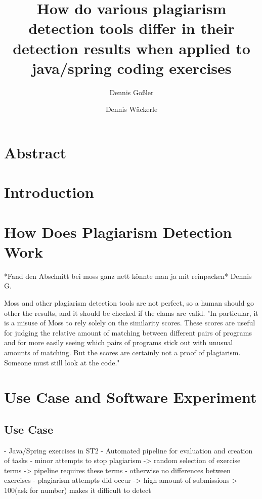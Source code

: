 \documentclass[a4paper, 11pt]{article}
\renewcommand{\\}{\vspace*{0.5\baselineskip} \newline}
\begin{document}
\title{How do various plagiarism detection tools differ in their detection results when applied to java/spring coding exercises}
\author{Dennis Goßler \and Dennis Wäckerle}
\maketitle

\section*{Abstract}
\newpage
\tableofcontents
\newpage

\section{Introduction}

\section{How Does Plagiarism Detection Work}


*Fand den Abschnitt bei moss ganz nett könnte man ja mit reinpacken* Dennis G.

Moss and other plagiarism detection tools are not perfect, so a human should go other the results, and it should be checked if the clams are valid.
"In particular, it is a misuse of Moss to rely solely on the similarity scores. These scores are useful for judging the relative amount of matching between different pairs of programs and for more easily seeing which pairs of programs stick out with unusual amounts of matching. But the scores are certainly not a proof of plagiarism. Someone must still look at the code."
\autocite{SMOSS}

\section{Use Case and Software Experiment}

\subsection{Use Case}

- Java/Spring exercises in ST2
- Automated pipeline for evaluation and creation of tasks
- minor attempts to stop plagiarism -> random selection of exercise terms -> pipeline requires these terms
- otherwise no differences between exercises
- plagiarism attempts did occur -> high amount of submissions > 100(ask for number) makes it difficult to detect
\end{document}

